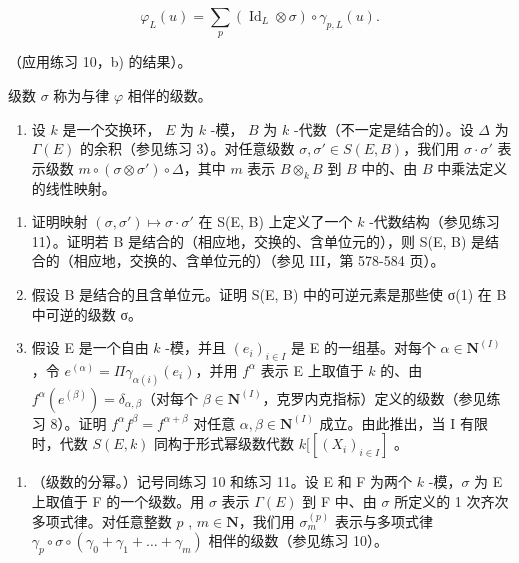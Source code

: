 \[
\varphi_ {L} (u) = \sum_ {p} \left(\operatorname{Id} _ {L} \otimes \sigma\right) \circ \gamma_ {p, L} (u). \tag {ii}
\]

（应用练习 10，b) 的结果）。

级数 \(\sigma\) 称为与律 \(\varphi\) 相伴的级数。

\begin{enumerate}
\def\labelenumi{\arabic{enumi})}
\setcounter{enumi}{11}
\tightlist
\item
  设 \(k\) 是一个交换环， \(E\) 为 \(k\) -模， \(B\) 为 \(k\) -代数（不一定是结合的）。设 \(\Delta\) 为 \(\Gamma(E)\) 的余积（参见练习 3）。对任意级数 \(\sigma, \sigma' \in S(E, B)\)，我们用 \(\sigma \cdot \sigma'\) 表示级数 \(m \circ (\sigma \otimes \sigma') \circ \Delta\)，其中 \(m\) 表示 \(B \otimes_k B\) 到 \(B\) 中的、由 \(B\) 中乘法定义的线性映射。
\end{enumerate}

\begin{enumerate}
\def\labelenumi{\alph{enumi})}
\item
  证明映射 \((\sigma, \sigma') \mapsto \sigma \cdot \sigma'\) 在 S(E, B) 上定义了一个 \(k\) -代数结构（参见练习 11）。证明若 B 是结合的（相应地，交换的、含单位元的），则 S(E, B) 是结合的（相应地，交换的、含单位元的）（参见 III，第 578-584 页）。
\item
  假设 B 是结合的且含单位元。证明 S(E, B) 中的可逆元素是那些使 σ(1) 在 B 中可逆的级数 σ。
\item
  假设 E 是一个自由 \(k\) -模，并且 \((e_i)_{i \in I}\) 是 E 的一组基。对每个 \(\alpha \in \mathbf{N}^{(I)}\)，令 \(e^{(\alpha)} = \Pi \gamma_{\alpha(i)}(e_i)\)，并用 \(f^\alpha\) 表示 E 上取值于 \(k\) 的、由 \(f^\alpha(e^{(\beta)}) = \delta_{\alpha, \beta}\)（对每个 \(\beta \in \mathbf{N}^{(I)}\)，克罗内克指标）定义的级数（参见练习 8）。证明 \(f^\alpha f^\beta = f^{\alpha + \beta}\) 对任意 \(\alpha, \beta \in \mathbf{N}^{(I)}\) 成立。由此推出，当 I 有限时，代数 \(S(E, k)\) 同构于形式幂级数代数 \(k[[(X_i)_{i \in I}]\) 。
\end{enumerate}

\begin{enumerate}
\def\labelenumi{\arabic{enumi})}
\setcounter{enumi}{12}
\tightlist
\item
  （级数的分幂。）记号同练习 10 和练习 11。设 E 和 F 为两个 \(k\) -模，\(\sigma\) 为 E 上取值于 F 的一个级数。用 \(\sigma\) 表示 \(\Gamma(E)\) 到 F 中、由 \(\sigma\) 所定义的 1 次齐次多项式律。对任意整数 \(p\) , \(m \in \mathbf{N}\)，我们用 \(\sigma_m^{(p)}\) 表示与多项式律 \(\gamma_p \circ \sigma \circ (\gamma_0 + \gamma_1 + \ldots + \gamma_m)\) 相伴的级数（参见练习 10）。
\end{enumerate}

